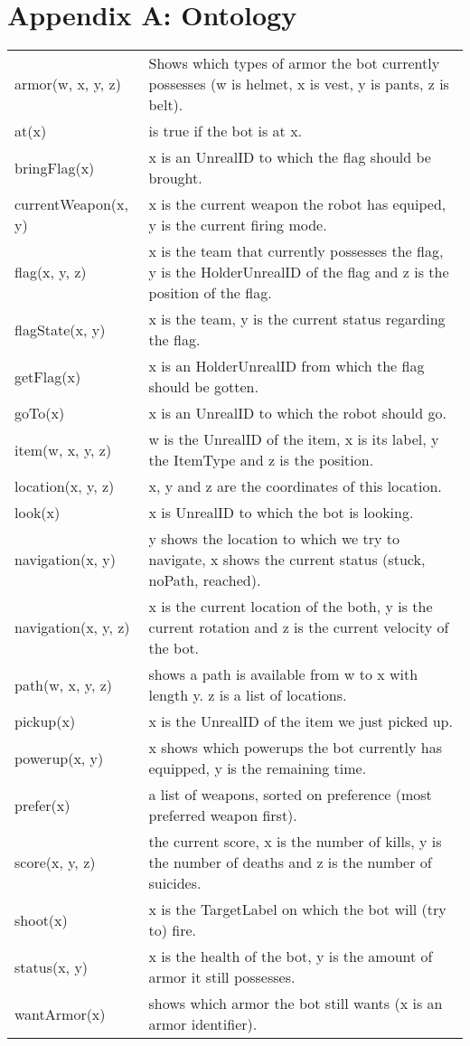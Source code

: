 \chapter*{Appendix A: Ontology}
\begin{tabular}{ l | p{12cm}}
  armor(w, x, y, z) & Shows which types of armor the bot currently possesses (w is helmet, x is vest, y is pants, z is belt). \\
  at(x) & is true if the bot is at x. \\
  bringFlag(x) & x is an UnrealID to which the flag should be brought. \\
  currentWeapon(x, y) & x is the current weapon the robot has equiped, y is the current firing mode. \\
  flag(x, y, z) & x is the team that currently possesses the flag, y is the HolderUnrealID of the flag and z is the position of the flag. \\
  flagState(x, y) & x is the team, y is the current status regarding the flag. \\
  getFlag(x) & x is an HolderUnrealID from which the flag should be gotten. \\
  goTo(x) & x is an UnrealID to which the robot should go. \\
  item(w, x, y, z) & w is the UnrealID of the item, x is its label, y the ItemType and z is the position. \\
  location(x, y, z) & x, y and z are the coordinates of this location. \\
  look(x) & x is UnrealID to which the bot is looking. \\
  navigation(x, y) & y shows the location to which we try to navigate, x shows the current status (stuck, noPath, reached). \\
  navigation(x, y, z) & x is the current location of the both, y is the current rotation and z is the current velocity of the bot. \\
  path(w, x, y, z) & shows a path is available from w to x with length y. z is a list of locations. \\
  pickup(x) & x is the UnrealID of the item we just picked up. \\
  powerup(x, y) & x shows which powerups the bot currently has equipped, y is the remaining time. \\
  prefer(x) & a list of weapons, sorted on preference (most preferred weapon first). \\
  score(x, y, z) & the current score, x is the number of kills, y is the number of deaths and z is the number of suicides. \\
  shoot(x) & x is the TargetLabel on which the bot will (try to) fire. \\
  status(x, y) & x is the health of the bot, y is the amount of armor it still possesses. \\
  wantArmor(x) & shows which armor the bot still wants (x is an armor identifier). \\
\end{tabular}